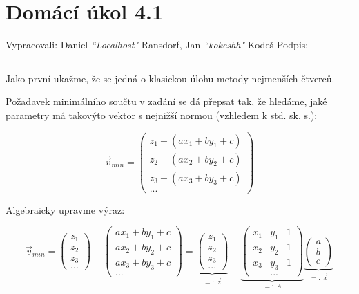 \documentclass[12pt]{article}
\begin{document}
\section*{Domácí úkol 4.1}

Vypracovali: Daniel \textit{``Localhost"} Ransdorf, Jan \textit{``kokeshh"} Kodeš \hfill Podpis: \rule{4cm}{0.4pt}


\bigskip

Jako první ukažme, že se jedná o klasickou úlohu metody nejmenších čtverců.

Požadavek minimálního součtu v zadání se dá přepsat tak, že hledáme,
jaké parametry má takovýto vektor s nejnižší normou (vzhledem k std. sk. s.):

\[
  \vec{v}_{min} = \left(\begin{array}{c}
    z_1 - (ax_1 + by_1 + c) \\
    z_2 - (ax_2 + by_2 + c) \\
    z_3 - (ax_3 + by_3 + c) \\
    ...
  \end{array}\right)
\]

Algebraicky upravme výraz:

\[
  \vec{v}_{min} = \left(\begin{array}{c}
    z_1\\
    z_2\\
    z_3\\
    ...
  \end{array}\right) - \left(\begin{array}{c}
    ax_1 + by_1 + c \\
    ax_2 + by_2 + c \\
    ax_3 + by_3 + c \\
    ...
  \end{array}\right)
  =
  \underbrace{\left(\begin{array}{c}
    z_1\\
    z_2\\
    z_3\\
    ...
  \end{array}\right)}_{=:\ \vec{z}} - \underbrace{\left(\begin{array}{ccc}
    x_1 & y_1 & 1 \\
    x_2 & y_2 & 1 \\
    x_3 & y_3 & 1 \\
    &...&
  \end{array}\right)}_{=:\ A} \underbrace{\left(\begin{array}{c}
    a \\ b \\ c
  \end{array}\right)}_{=:\ \vec{x}}
\]
\end{document}
